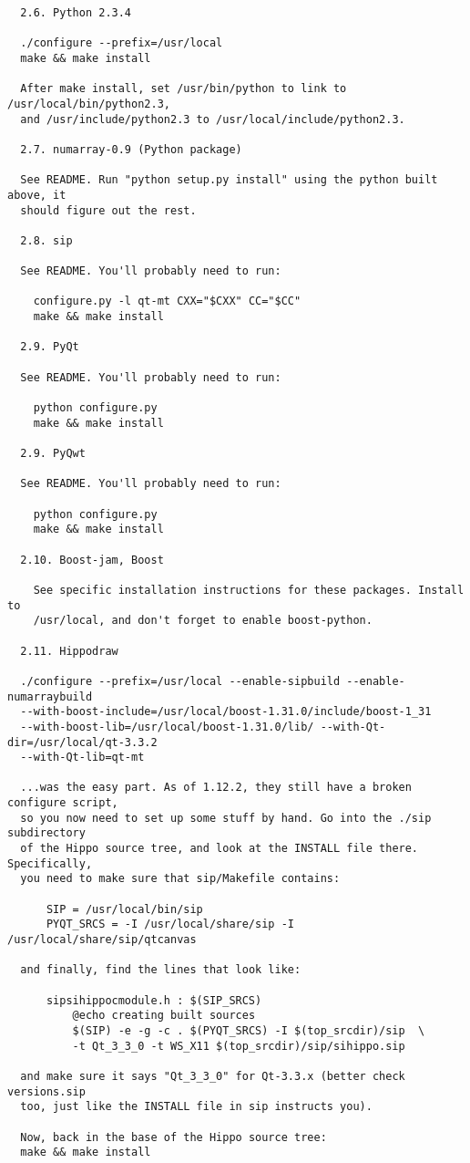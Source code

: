 \documentclass[10pt]{article}
\begin{document}
\begin{verbatim}
  2.6. Python 2.3.4

  ./configure --prefix=/usr/local
  make && make install

  After make install, set /usr/bin/python to link to /usr/local/bin/python2.3,
  and /usr/include/python2.3 to /usr/local/include/python2.3.

  2.7. numarray-0.9 (Python package)

  See README. Run "python setup.py install" using the python built above, it
  should figure out the rest.

  2.8. sip

  See README. You'll probably need to run:
  
    configure.py -l qt-mt CXX="$CXX" CC="$CC"
    make && make install
    
  2.9. PyQt

  See README. You'll probably need to run:
  
    python configure.py 
    make && make install
    
  2.9. PyQwt

  See README. You'll probably need to run:
  
    python configure.py 
    make && make install
    
  2.10. Boost-jam, Boost 
    
    See specific installation instructions for these packages. Install to
    /usr/local, and don't forget to enable boost-python.

  2.11. Hippodraw 

  ./configure --prefix=/usr/local --enable-sipbuild --enable-numarraybuild
  --with-boost-include=/usr/local/boost-1.31.0/include/boost-1_31
  --with-boost-lib=/usr/local/boost-1.31.0/lib/ --with-Qt-dir=/usr/local/qt-3.3.2
  --with-Qt-lib=qt-mt
  
  ...was the easy part. As of 1.12.2, they still have a broken configure script,
  so you now need to set up some stuff by hand. Go into the ./sip subdirectory
  of the Hippo source tree, and look at the INSTALL file there. Specifically,
  you need to make sure that sip/Makefile contains:

      SIP = /usr/local/bin/sip
      PYQT_SRCS = -I /usr/local/share/sip -I /usr/local/share/sip/qtcanvas
      
  and finally, find the lines that look like:

      sipsihippocmodule.h : $(SIP_SRCS) 
	      @echo creating built sources
	      $(SIP) -e -g -c . $(PYQT_SRCS) -I $(top_srcdir)/sip  \
	      -t Qt_3_3_0 -t WS_X11 $(top_srcdir)/sip/sihippo.sip
  
  and make sure it says "Qt_3_3_0" for Qt-3.3.x (better check versions.sip
  too, just like the INSTALL file in sip instructs you).
  
  Now, back in the base of the Hippo source tree:
  make && make install

\end{verbatim}
  
\end{document}

